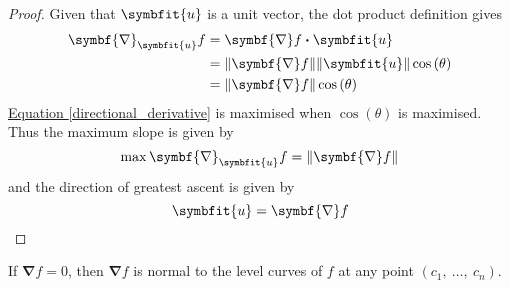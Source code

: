 \documentclass{article}
\begin{document}
\begin{proof}
    Given that $\symbfit{u}$ is a unit vector, the dot product definition
    gives
    \begin{align}
        \symbf{\nabla}_{\symbfit{u}}f &= \symbf{\nabla}f \vdot \symbfit{u} \nonumber \\
        &= \norm{\symbf{\nabla}f} \norm{\symbfit{u}} \cos{\left( \theta \right)} \nonumber \\
        &= \norm{\symbf{\nabla}f} \cos{\left( \theta \right)} \label{directional_derivative}
    \end{align}
    \hyperref[directional_derivative]{Equation \ref{directional_derivative}} is
    maximised when $\cos{\left( \theta \right)}$ is maximised. Thus the
    maximum slope is given by
    \begin{equation*}
        \max \symbf{\nabla}_{\symbfit{u}}f = \norm{\symbf{\nabla}f}
    \end{equation*}
    and the direction of greatest ascent is given by
    \begin{equation*}
        \symbfit{u} = \symbf{\nabla}f
    \end{equation*}
\end{proof}
\begin{theorem}
    If $\symbf{\nabla}f = 0$, then $\symbf{\nabla}f$ is normal to the level
    curves of $f$ at any point $(c_1,\: \ldots,\: c_n)$.
\end{theorem}
\end{document}
